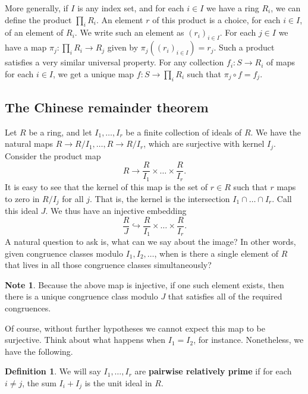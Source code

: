 \documentclass{article}
\newcommand{\rb}[1]{\left( #1 \right)}
\theoremstyle{definition}\newtheorem{definition}{Definition}[section]
\theoremstyle{definition}\newtheorem{remark}[definition]{Remark}
\theoremstyle{definition}\newtheorem*{example}{Example}
\theoremstyle{definition}\newtheorem*{note}{Note}
\begin{document}
More generally, if $ I $ is any index set, and for each $ i \in I $ we have a ring $ R_i $, we can define the product $ \prod_i R_i $. An element $ r $ of this product is a choice, for each $ i \in I $, of an element of $ R_i $. We write such an element as $ \rb{r_i}_{i \in I} $. For each $ j \in I $ we have a map $ \pi_j : \prod_i R_i \to R_j $ given by $ \pi_j\rb{\rb{r_i}_{i \in I}} = r_j $. Such a product satisfies a very similar universal property. For any collection $ f_i : S \to R_i $ of maps for each $ i \in I $, we get a unique map $ f : S \to \prod_i R_i $ such that $ \pi_j \circ f = f_j $.

\subsection{The Chinese remainder theorem}

Let $ R $ be a ring, and let $ I_1, \dots, I_r $ be a finite collection of ideals of $ R $. We have the natural maps $ R \to R / I_1, \dots, R \to R / I_r $, which are surjective with kernel $ I_j $. Consider the product map
$$ R \to \dfrac{R}{I_1} \times \dots \times \dfrac{R}{I_r}. $$
It is easy to see that the kernel of this map is the set of $ r \in R $ such that $ r $ maps to zero in $ R / I_j $ for all $ j $. That is, the kernel is the intersection $ I_1 \cap \dots \cap I_r $. Call this ideal $ J $. We thus have an injective embedding
$$ \dfrac{R}{J} \hookrightarrow \dfrac{R}{I_1} \times \dots \times \dfrac{R}{I_r}. $$
A natural question to ask is, what can we say about the image? In other words, given congruence classes modulo $ I_1, I_2, \dots $, when is there a single element of $ R $ that lives in all those congruence classes simultaneously?

\begin{note}
Because the above map is injective, if one such element exists, then there is a unique congruence class modulo $ J $ that satisfies all of the required congruences.
\end{note}

Of course, without further hypotheses we cannot expect this map to be surjective. Think about what happens when $ I_1 = I_2 $, for instance. Nonetheless, we have the following.

\begin{definition}
We will say $ I_1, \dots, I_r $ are \textbf{pairwise relatively prime} if for each $ i \ne j $, the sum $ I_i + I_j $ is the unit ideal in $ R $.
\end{definition}
\end{document}
